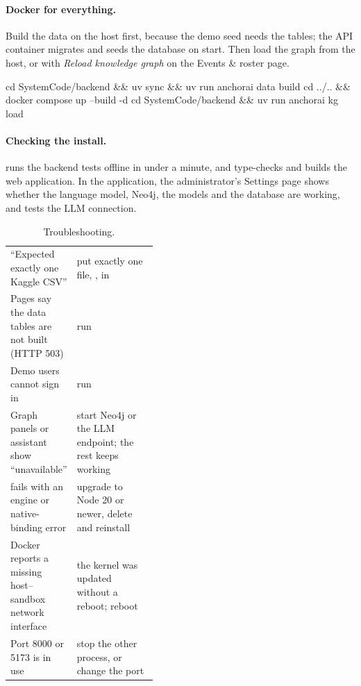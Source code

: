 \paragraph{Docker for everything.} Build the data on the host first, because the demo seed needs the tables; the API container migrates and seeds the database on start. Then load the graph from the host, or with \emph{Reload knowledge graph} on the Events \& roster page.
\begin{shell}
cd SystemCode/backend && uv sync && uv run anchorai data build
cd ../.. && docker compose up --build -d
cd SystemCode/backend && uv run anchorai kg load
\end{shell}

\paragraph{Checking the install.}  runs the backend tests offline in under a minute, and  type-checks and builds the web application. In the application, the administrator's Settings page shows whether the language model, Neo4j, the models and the database are working, and tests the LLM connection.

\begin{table}[H]
  \caption{Troubleshooting.}
  \label{tab:trouble}
  \begin{tabularx}{\linewidth}{@{}P{0.42\linewidth} L@{}}
    \toprule
     &  \\
    \midrule
    \enquote{Expected exactly one Kaggle CSV} & put exactly one file, , in  \\
    Pages say the data tables are not built (HTTP 503) & run  \\
    Demo users cannot sign in & run  \\
    Graph panels or assistant show \enquote{unavailable} & start Neo4j or the LLM endpoint; the rest keeps working \\
     fails with an engine or native-binding error & upgrade to Node 20 or newer, delete  and reinstall \\
    Docker reports a missing host--sandbox network interface & the kernel was updated without a reboot; reboot \\
    Port 8000 or 5173 is in use & stop the other process, or change the port \\
    \bottomrule
  \end{tabularx}
\end{table}

